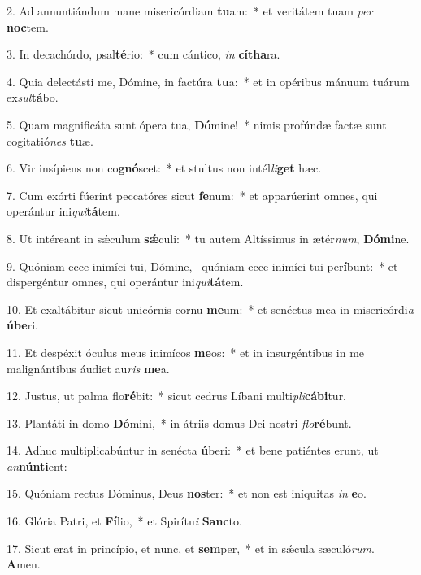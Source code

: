 2. Ad annuntiándum mane misericórdiam \textbf{tu}am:~*  et veritátem tuam \textit{per} \textbf{noc}tem.\

3. In decachórdo, psal\textbf{té}rio:~*  cum cántico, \textit{in} \textbf{cí}\textbf{tha}ra.\

4. Quia delectásti me, Dómine, in factúra \textbf{tu}a:~*  et in opéribus mánuum tuárum ex\textit{sul}\textbf{tá}bo.\

5. Quam magnificáta sunt ópera tua, \textbf{Dó}mine!~*  nimis profúndæ factæ sunt cogitatió\textit{nes} \textbf{tu}æ.\

6. Vir insípiens non co\textbf{gnó}scet:~*  et stultus non intél\textit{li}\textbf{get} hæc.\

7. Cum exórti fúerint peccatóres sicut \textbf{fe}num:~*  et apparúerint omnes, qui operántur ini\textit{qui}\textbf{tá}tem.\

8. Ut intéreant in sǽculum \textbf{sǽ}culi:~*  tu autem Altíssimus in ætér\textit{num}, \textbf{Dó}\textbf{mi}ne.\

9. Quóniam ecce inimíci tui, Dómine, \dag\  quóniam ecce inimíci tui per\textbf{í}bunt:~*  et dispergéntur omnes, qui operántur ini\textit{qui}\textbf{tá}tem.\

10. Et exaltábitur sicut unicórnis cornu \textbf{me}um:~*  et senéctus mea in misericórdi\textit{a} \textbf{ú}\textbf{be}ri.\

11. Et despéxit óculus meus inimícos \textbf{me}os:~*  et in insurgéntibus in me malignántibus áudiet au\textit{ris} \textbf{me}a.\

12. Justus, ut palma flo\textbf{ré}bit:~*  sicut cedrus Líbani multi\textit{pli}\textbf{cá}\textbf{bi}tur.\

13. Plantáti in domo \textbf{Dó}mini,~*  in átriis domus Dei nostri \textit{flo}\textbf{ré}bunt.\

14. Adhuc multiplicabúntur in senécta \textbf{ú}beri:~*  et bene patiéntes erunt, ut \textit{an}\textbf{nún}\textbf{ti}ent:\

15. Quóniam rectus Dóminus, Deus \textbf{nos}ter:~*  et non est iníquitas \textit{in} \textbf{e}o.\

16. Glória Patri, et \textbf{Fí}lio,~*  et Spirítu\textit{i} \textbf{Sanc}to.\

17. Sicut erat in princípio, et nunc, et \textbf{sem}per,~*  et in sǽcula sæculó\textit{rum}. \textbf{A}men.\

